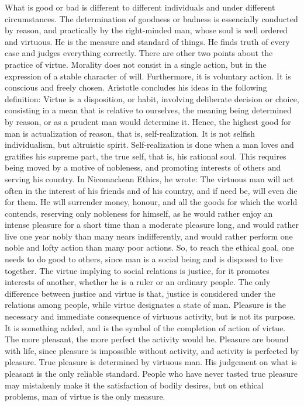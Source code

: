 \documentclass[11pt]{article}
\begin{document}
  What is good or bad is different to different individuals and under different circumstances. The determination of goodness or badness is essencially conducted by reason, and practically by the right-minded man, whose soul is well ordered and virtuous. He is the measure and standard of things. He finds truth of every case and judges everything correctly. 
  There are other two points about the practice of virtue. Morality does not consist in a single action, but in the expression of a stable character of will. Furthermore, it is voluntary action. It is conscious and freely chosen. Aristotle concludes his ideas in the following definition:
  Virtue is a disposition, or habit, involving deliberate decision or choice, consisting in a mean that is relative to ourselves, the meaning being determined by reason, or as a prudent man would determine it.
  Hence, the highest good for man is actualization of reason, that is, self-realization. It is not selfish individualism, but altruistic spirit. Self-realization is done when a man loves and gratifies his supreme part, the true self, that is, his rational soul. This requires being moved by a motive of nobleness, and promoting interests of others and serving his country. In Nicomackean Ethics, he wrote:
  The virtuous man will act often in the interest of his friends and of his country, and if need be, will even die for them. He will surrender money, honour, and all the goods for which the world contends, reserving only nobleness for himself, as he would rather enjoy an intense pleasure for a short time than a moderate pleasure long, and would rather live one year nobly than many nears indifferently, and would rather perform one noble and lofty action than many poor actions.
  So, to reach the ethical goal, one needs to do good to others, since man is a social being and is disposed to live together. The virtue implying to social relations is justice, for it promotes interests of another, whether he is a ruler or an ordinary people. The only difference between justice and virtue is that, justice is considered under the relations among people, while virtue designates a state of man.
  Pleasure is the necessary and immediate consequence of virtuous activity, but is not its purpose. It is something added, and is the symbol of the completion of action of virtue. The more pleasant, the more perfect the activity would be. Pleasure are bound with life, since pleasure is impossible without activity, and activity is perfected by pleasure. True pleasure is determined by virtuous man. His judgement on what is pleasant is the only reliable standard. People who have never tasted true pleasure may mistakenly make it the satisfaction of bodily desires, but on ethical problems, man of virtue is the only measure.
\end{document}
